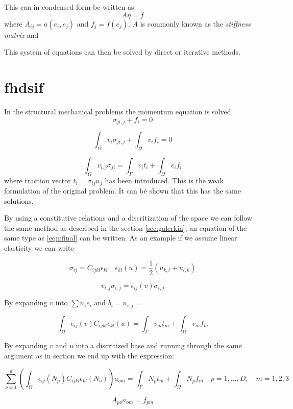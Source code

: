 \documentclass[fem.tex]{subfiles}
\begin{document}
This can in condensed form be written as
\begin{equation} 
    A \eta = f
    \label{eqn:cond}
\end{equation}
where $A_{ij} = a(e_i, e_j)$ and $f_j = f(e_j)$. $A$ is commonly known as the \textit{stiffness matrix} and 

This system of equations can then be solved by direct or iterative methods.%


\section{fhdsif}
In the structural mechanical problems the momentum equation is solved
%
\begin{equation} 
   \sigma_{ji,j} + f_i = 0
    \label{eqn:cond}
\end{equation}
%

%
\begin{equation} 
  \int_\Omega  v_i\sigma_{ji,j} + \int_\Omega v_i f_i = 0
    \label{eqn:cond}
\end{equation}
%

%
\begin{equation} 
  \int_\Omega  v_{i,j} \sigma_{ji}  = \int_\Gamma v_i t_i + \int_\Omega v_i f_i
    \label{eqn:weak}
\end{equation}
%
where traction vector $t_i = \sigma_{ij}n_j$ has been introduced. This is the weak formulation of the original problem. It can be shown that this has the same solutions.

By using a constitutive relations and a discritization of the space we can follow the same method as described in the section \ref{sec:galerkin}, an equation of the same type as  \ref{eqn:final} can be written. As an example if we assume linear elasticity we can write

\[ \sigma_{ij} = C_{ijkl} \epsilon_{kl} \quad  \epsilon_{kl}(u) = \frac{1}{2} \left(u_{k,l} + u_{l,k}\right)  \]

\[ v_{i,j} \sigma_{i,j} =  \epsilon_{ij}(v) \sigma_{i,j} \]

By expanding $v$ into $\sum n_i e_i$ and $b_i = n_{i,j}$  = 

\begin{equation} 
  \int_\Omega  \epsilon_{ij}(v)  C_{ijkl} \epsilon_{kl}(u)  = \int_\Gamma v_m t_m + \int_\Omega v_m f_m
    \label{eqn:weak}
\end{equation}
%

By expanding $v$ and $u$ into a discritized base and running through the same argument as in section we end up with the expression:

\begin{equation} 
\sum_{o = 1}^d \left( \int_\Omega  \epsilon_{ij}(N_p)  C_{ijkl} \epsilon_{kl}(N_o)\right) a_{om}  = \int_\Gamma N_p t_m + \int_\Omega N_p f_m
    \quad p = 1, ..., D, \quad m = 1,2,3
\end{equation}

\begin{equation} 
A_{po} a_{om} = f_{pm}
\end{equation}
\end{document}
